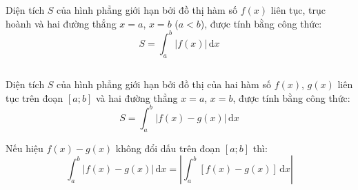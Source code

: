 \documentclass[12pt,a4paper]{extarticle}
\begin{document}
\makeheadbox[headerright={Chương 4},chude={Bài 3},tieude={Ứng dụng tích phân},dinhdang={Giải tích},lop={12 },gv={Nguyễn Lê Minh Ngọc}]
\vspace{2em}
\section*{\color{myblue}{1. ỨNG DỤNG TÍCH PHÂN ĐỂ TÍNH DIỆN TÍCH HÌNH PHẲNG}}
\subsection*{\color{myblue}{a) Hình phẳng giới hạn bởi một đồ thị hàm số, trục hoành và hai đường thẳng $x=a, x=b$}}
\begin{tcolorbox}[colback=lightblue, colframe=myblue, arc=2mm]
Diện tích $S$ của hình phẳng giới hạn bởi đồ thị hàm số $f(x)$ liên tục, trục hoành và hai đường thẳng $x = a$, $x = b$ ($a < b$), được tính bằng công thức:
\[
S = \int_{a}^{b} |f(x)| \, \mathrm{d}x
\]
\end{tcolorbox}
\subsection*{\color{myblue}{b) Hình phẳng giới hạn bởi hai đồ thị hàm số và hai đường thẳng $x=a, x=b$}}
\begin{tcolorbox}[colback=lightblue, colframe=myblue, arc=2mm]
Diện tích $S$ của hình phẳng giới hạn bởi đồ thị của hai hàm số $f(x)$, $g(x)$ liên tục trên đoạn $[a; b]$ và hai đường thẳng $x = a$, $x = b$, được tính bằng công thức:
\[
S = \int_{a}^{b} |f(x) - g(x)| \, \mathrm{d}x
\]
\end{tcolorbox}
\vspace{0.5cm}
\noindent \textbf{} Nếu hiệu $f(x) - g(x)$ không đổi dấu trên đoạn $[a; b]$ thì:
\[
\int_{a}^{b} |f(x) - g(x)| \, \mathrm{d}x = \left| \int_{a}^{b} [f(x) - g(x)] \, \mathrm{d}x \right|
\]
\end{document}
